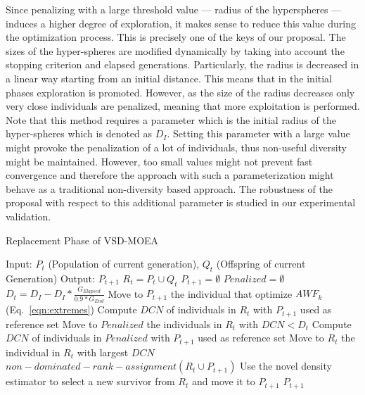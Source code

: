 Since penalizing with a large threshold value --- radius of the hyperspheres --- induces a higher degree of 
exploration, it makes sense to reduce this value during the optimization process.
%
This is precisely one of the keys of our proposal.
%
The sizes of the hyper-spheres are modified dynamically by taking into account the stopping 
criterion and elapsed generations.
%
Particularly, the radius is decreased in a linear way starting from an initial distance.
%
This means that in the initial phases exploration is promoted.
%
However, as the size of the radius decreases only very close individuals are penalized, meaning that more 
exploitation is performed.
%
Note that this method requires a parameter which is the initial radius of the hyper-spheres which is denoted as $D_I$. 
%
Setting this parameter with a large value might provoke the penalization of a lot of individuals, 
thus non-useful diversity might be maintained.
%
However, too small values might not prevent fast convergence and therefore the approach with such a parameterization 
might behave as a traditional non-diversity based approach.
%
The robustness of the proposal with respect to this additional parameter is studied in our experimental validation.

\begin{algorithm}[t]
  \scriptsize
	\caption{Replacement Phase of VSD-MOEA} 
\begin{algorithmic}[1]
\STATE Input: $P_t$ (Population of current generation), $Q_t$ (Offspring of current Generation)
    	\STATE Output: $P_{t+1}$ 
        \STATE $R_t = P_t \cup Q_t$ \label{alg:1}
        \STATE $P_{t+1} = \emptyset$ \label{alg:2}
        \STATE $Penalized = \emptyset$ \label{alg:3}
				\STATE $D_t = D_I - D_I * \frac{G_{Elapsed}}{0.9*G_{End}}$ \label{alg:4}
					\STATE Move to $P_{t+1}$ the individual that optimize $AWF_k$ (Eq.~\ref{eqn:extremes})
				\ENDFOR
         \label{alg:6}
					\STATE Compute $DCN$ of individuals in $R_t$ with $P_{t+1}$ used as reference set \label{alg:7}
					\STATE Move to $Penalized$ the individuals in $R_t$ with $DCN < D_t$  \label{alg:8}
        	 \label{alg:9}
						\STATE Compute $DCN$ of individuals in $Penalized$ with $P_{t+1}$ used as reference set \label{alg:10}
						\STATE Move to $R_t$ the individual in $R_t$ with largest $DCN$ \label{alg:11}
        	\ENDIF
					\STATE $non-dominated-rank-assignment(R_t \cup P_{t+1}) $ \label{alg:12}
					\STATE Use the novel density estimator to select a new survivor from $R_t$ and move it to $P_{t+1}$\label{alg:13}
        \ENDWHILE
    	\RETURN $P_{t+1}$ \label{alg:14}
	\end{algorithmic}
\label{alg:Replacement_Phase}
\end{algorithm}


